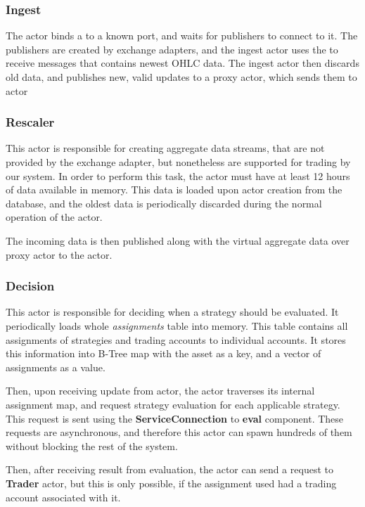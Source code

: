 \subsubsection{Ingest}
The  actor binds a  to a known port, and waits for publishers to connect to it.
The publishers are created by exchange adapters, and the ingest actor uses the  to receive
messages that contains newest OHLC data. The ingest actor then discards old data, and publishes new, valid updates
to a proxy actor, which sends them to   actor

\subsubsection{Rescaler}
This actor is responsible for creating aggregate data streams, that are not provided
by the exchange adapter, but nonetheless are supported for trading by our system. In order
to perform this task, the actor must have at least 12 hours of data available in memory. This data is loaded upon
actor creation from the database, and the oldest data is periodically discarded during the normal operation of the actor.

The incoming data is then published along with the virtual aggregate data over proxy actor to the  actor.

\subsubsection{Decision}
This actor is responsible for deciding when a strategy should be evaluated. It periodically loads whole
\textit{assignments} table into memory. This table contains all assignments of strategies and trading accounts
to individual accounts. It stores this information into B-Tree map with the asset as a
key, and a vector of assignments as a value.

Then, upon receiving update from  actor, the  actor traverses its internal
assignment map, and request strategy evaluation for each applicable strategy. This request is sent using
the \textbf{ServiceConnection} to \textbf{eval} component. These requests are asynchronous, and therefore
this actor can spawn hundreds of them without blocking the rest of the system.

Then, after receiving result from evaluation, the actor can send a request to \textbf{Trader} actor,
but this is only possible, if the assignment used had a trading account associated with it.

